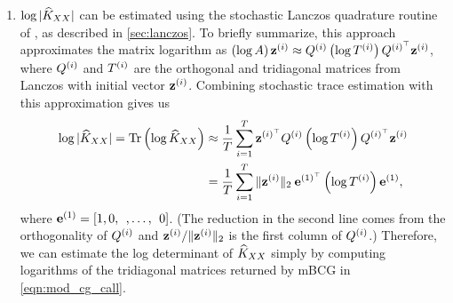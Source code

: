 \begin{enumerate}
  \item $\log \vert \widehat{K}_{XX} \vert$
    can be estimated using the stochastic Lanczos quadrature routine of \citet{ubaru2017fast}, as described in \cref{sec:lanczos}.
    To briefly summarize, this approach approximates the matrix logarithm as $\left( \log A \right) \mathbf{z}^{(i)} \approx Q^{(i)} \left( \log T^{(i)} \right) Q^{(i)^\top} \mathbf{z}^{(i)}$,
    where $Q^{(i)}$ and $T^{(i)}$ are the orthogonal and tridiagonal matrices from Lanczos with initial vector $\mathbf{z}^{(i)}$.
    Combining stochastic trace estimation with this approximation gives us
    \begin{align*}
      \log \vert \trainK \vert = \tr{ \log \trainK }
      &\approx \frac{1}{T} \sum_{i=1}^T \bz^{(i)^\top} \bQ^{(i)} \left( \log \bT^{(i)} \right) \bQ^{(i)^\top} \bz^{(i)}
      \\
      &= \frac{1}{T} \sum_{i=1}^T \Vert \bz^{(i)} \Vert_2 \: \be^{(1)^\top} \left( \log \bT^{(i)} \right) \be^{(1)},
    \end{align*}
    where $\mathbf{e}^{(1)} = [1, 0, \:\:, \ldots, \:\: 0]$.
    (The reduction in the second line comes from the orthogonality of $Q^{(i)}$ and $\mathbf{z}^{(i)} / \Vert \mathbf{z}^{(i)} \Vert_2$ is the first column of $Q^{(i)}$.)
    Therefore, we can estimate the log determinant of $\widehat{K}_{XX}$ simply by computing logarithms of the tridiagonal matrices returned by mBCG in \cref{eqn:mod_cg_call}.

\end{enumerate}
